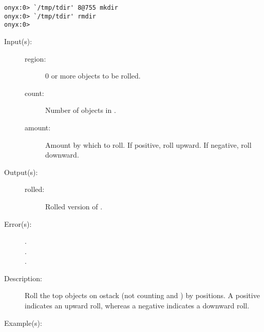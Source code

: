 \begin{description}
\begin{description}
\begin{verbatim}
onyx:0> `/tmp/tdir' 8@755 mkdir
onyx:0> `/tmp/tdir' rmdir
onyx:0>
		\end{verbatim}
	\end{description}
\label{systemdict:roll}
\item[{\onyxop{region count amount}{roll}{rolled}}: ]
	\begin{description}\item[]
	\item[Input(s): ]
		\begin{description}\item[]
		\item[region: ]
			0 or more objects to be rolled.
		\item[count: ]
			Number of objects in .
		\item[amount: ]
			Amount by which to roll.  If positive, roll
			upward.  If negative, roll downward.
		\end{description}
	\item[Output(s): ]
		\begin{description}\item[]
		\item[rolled: ]
			Rolled version of .
		\end{description}
	\item[Error(s): ]
		\begin{description}\item[]
		\item[.]
		\item[.]
		\item[.]
		\end{description}
	\item[Description: ]
		Roll the top  objects on ostack (not counting
		 and ) by  positions.
		A positive  indicates an upward roll, whereas a
		negative  indicates a downward roll.
	\item[Example(s): ]\begin{verbatim}


\end{verbatim}
\end{description}
\end{description}
